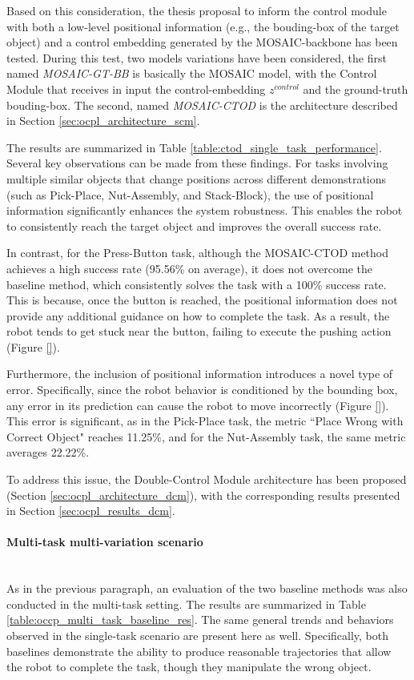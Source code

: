 Based on this consideration, the thesis proposal to inform the control module with both a low-level positional information (e.g., the bouding-box of the target object) and a control embedding generated by the MOSAIC-backbone has been tested. During this test, two models variations have been considered, the first named \textit{MOSAIC-GT-BB} is basically the MOSAIC model, with the Control Module that receives in input the control-embedding $z^{control}$ and the ground-truth bouding-box. The second, named \textit{MOSAIC-CTOD} is the architecture described in Section \ref{sec:ocpl_architecture_scm}.


The results are summarized in Table \ref{table:ctod_single_task_performance}. Several key observations can be made from these findings. For tasks involving multiple similar objects that change positions across different demonstrations (such as Pick-Place, Nut-Assembly, and Stack-Block), the use of positional information significantly enhances the system robustness. This enables the robot to consistently reach the target object and improves the overall success rate.

In contrast, for the Press-Button task, although the MOSAIC-CTOD method achieves a high success rate (95.56\% on average), it does not overcome the baseline method, which consistently solves the task with a 100\% success rate. This is because, once the button is reached, the positional information does not provide any additional guidance on how to complete the task. As a result, the robot tends to get stuck near the button, failing to execute the pushing action (Figure \ref{}).

Furthermore, the inclusion of positional information introduces a novel type of error. Specifically, since the robot behavior is conditioned by the bounding box, any error in its prediction can cause the robot to move incorrectly (Figure \ref{}). This error is significant, as in the Pick-Place task, the metric ``Place Wrong with Correct Object" reaches 11.25\%, and for the Nut-Assembly task, the same metric averages 22.22\%.

To address this issue, the Double-Control Module architecture has been proposed (Section \ref{sec:ocpl_architecture_dcm}), with the corresponding results presented in Section \ref{sec:ocpl_results_dcm}.

\paragraph*{Multi-task multi-variation scenario}\mbox{}\\
As in the previous paragraph, an evaluation of the two baseline methods was also conducted in the multi-task setting. The results are summarized in Table \ref{table:occp_multi_task_baseline_res}. The same general trends and behaviors observed in the single-task scenario are present here as well. Specifically, both baselines demonstrate the ability to produce reasonable trajectories that allow the robot to complete the task, though they manipulate the wrong object.

